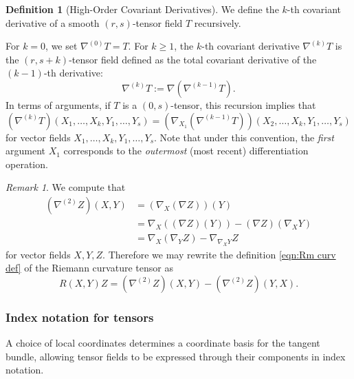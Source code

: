 \documentclass[11pt]{article}
\theoremstyle{plain}
\theoremstyle{definition}
\newtheorem{definition}[theorem]{Definition}
\theoremstyle{remark}
\newtheorem{remark}[theorem]{Remark}
\newcommand{\vspacesub}{\vspace{0pt}}
\begin{document}
\begin{definition}[High-Order Covariant Derivatives]
\label{def:high_order_cov_dev}
    We define the $k$-th covariant derivative of a smooth $(r,s)$-tensor field $T$ recursively.
    
    For $k=0$, we set $\nabla^{(0)} T = T$. For $k \geq 1$, the $k$-th covariant derivative $\nabla^{(k)} T$ is the $(r, s+k)$-tensor field defined as the total covariant derivative of the $(k-1)$-th derivative:
    \begin{equation}
        \nabla^{(k)} T := \nabla (\nabla^{(k-1)} T).
    \end{equation}
    In terms of arguments, if $T$ is a $(0,s)$-tensor, this recursion implies that
    \begin{equation}
        (\nabla^{(k)} T)(X_1, \dots, X_k, Y_1, \dots, Y_s) = (\nabla_{X_1} (\nabla^{(k-1)} T))(X_2, \dots, X_k, Y_1, \dots, Y_s)
    \end{equation}
    for vector fields $X_1, \dots, X_k, Y_1, \dots, Y_s$.
    Note that under this convention, the \emph{first} argument $X_1$ corresponds to the \emph{outermost} (most recent) differentiation operation.
\end{definition}

\begin{remark}
We compute that
\begin{align*}
    (\nabla^{(2)}Z)(X,Y) & = (\nabla_X (\nabla Z)) (Y) \\
    & = \nabla_X( (\nabla Z)(Y)) - (\nabla Z) (\nabla_X Y) \\
    & = \nabla_X(\nabla_Y Z) - \nabla_{\nabla_X Y} Z 
\end{align*}
for vector fields $X,Y,Z$. 
Therefore we may rewrite the definition \eqref{eqn:Rm curv def} of the Riemann curvature tensor as
\begin{equation}
    R(X,Y)Z = (\nabla^{(2)}Z)(X,Y) - (\nabla^{(2)}Z)(Y,X) .
\end{equation}
\end{remark}

\subsubsection{Index notation for tensors}

\vspacesub

A choice of local coordinates determines a coordinate basis for the
tangent bundle, allowing tensor fields to be expressed through their
components in index notation.
\end{document}
